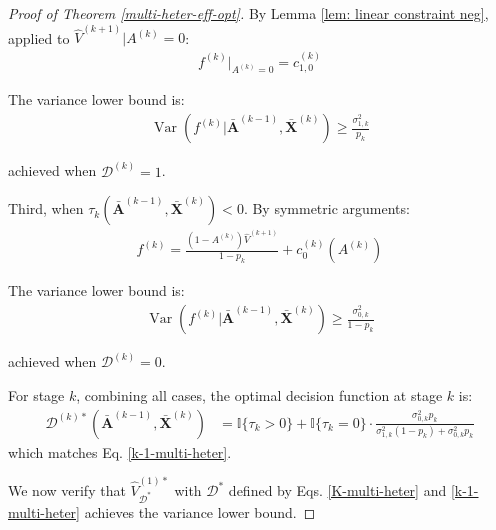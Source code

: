 \documentclass[11pt]{article}
\theoremstyle{referenceplain}
\theoremstyle{referencedefinition}
\theoremstyle{referenceremark}
\begin{document}
\begin{proof}[Proof of Theorem \ref{multi-heter-eff-opt}]
By Lemma \ref{lem: linear constraint neg}, applied to $\widehat{V}^{(k+1)} | A^{(k)} = 0$:
\begin{align}
    f^{(k)}|_{A^{(k)}=0} = c_{1,0}^{(k)}
\end{align}

The variance lower bound is:
\begin{align}
    \operatorname{Var}(f^{(k)} | \bar{\mathbf{A}}^{(k-1)}, \bar{\mathbf{X}}^{(k)}) \geq \frac{\sigma_{1,k}^2}{p_k}
\end{align}

achieved when $\mathcal{D}^{(k)} = 1$.

Third, when $\tau_k(\bar{\mathbf{A}}^{(k-1)}, \bar{\mathbf{X}}^{(k)}) < 0$. By symmetric arguments:
\begin{align}
    f^{(k)} = \frac{(1-A^{(k)}) \widehat{V}^{(k+1)}}{1-p_k} + c_0^{(k)}(A^{(k)})
\end{align}

The variance lower bound is:
\begin{align}
    \operatorname{Var}(f^{(k)} | \bar{\mathbf{A}}^{(k-1)}, \bar{\mathbf{X}}^{(k)}) \geq \frac{\sigma_{0,k}^2}{1-p_k}
\end{align}

achieved when $\mathcal{D}^{(k)} = 0$.

For stage $k$, combining all cases, the optimal decision function at stage $k$ is:
\begin{align}
    \mathcal{D}^{(k)*}(\bar{\mathbf{A}}^{(k-1)}, \bar{\mathbf{X}}^{(k)}) &= \mathbb{I}\{\tau_k > 0\} + \mathbb{I}\{\tau_k = 0\} \cdot \frac{\sigma_{0,k}^2 p_k}{\sigma_{1,k}^2 (1-p_k) + \sigma_{0,k}^2 p_k}
\end{align}
which matches Eq. \eqref{k-1-multi-heter}.


We now verify that $\widehat{V}_{\mathcal{D}^*}^{(1)*}$ with $\mathcal{D}^*$ defined by Eqs. \eqref{K-multi-heter} and \eqref{k-1-multi-heter} achieves the variance lower bound.


\end{proof}
\end{document}
